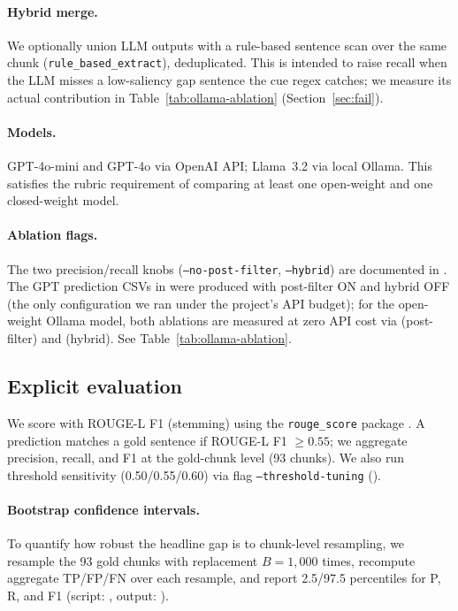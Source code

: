 \documentclass{article}
\begin{document}
\paragraph{Hybrid merge.} We optionally union LLM outputs with a rule-based sentence scan over the same chunk (\texttt{rule\_based\_extract}), deduplicated. This is intended to raise recall when the LLM misses a low-saliency gap sentence the cue regex catches; we measure its actual contribution in Table~\ref{tab:ollama-ablation} (Section~\ref{sec:fail}).

\paragraph{Models.} GPT-4o-mini and GPT-4o via OpenAI API; Llama~3.2 via local Ollama. This satisfies the rubric requirement of comparing at least one open-weight and one closed-weight model.

\paragraph{Ablation flags.} The two precision/recall knobs (\texttt{--no-post-filter}, \texttt{--hybrid}) are documented in . The GPT prediction CSVs in  were produced with post-filter ON and hybrid OFF (the only configuration we ran under the project's API budget); for the open-weight Ollama model, both ablations are measured at zero API cost via  (post-filter) and  (hybrid). See Table~\ref{tab:ollama-ablation}.

\subsection{Explicit evaluation}
We score with ROUGE-L F1 (stemming) using the \texttt{rouge\_score} package \citep{lin2004rouge,rougescore}. A prediction matches a gold sentence if ROUGE-L F1 $\ge 0.55$; we aggregate precision, recall, and F1 at the gold-chunk level (93 chunks). We also run threshold sensitivity (0.50/0.55/0.60) via  flag \texttt{--threshold-tuning} ().

\paragraph{Bootstrap confidence intervals.} To quantify how robust the headline gap is to chunk-level resampling, we resample the 93 gold chunks with replacement $B=1{,}000$ times, recompute aggregate TP/FP/FN over each resample, and report 2.5/97.5 percentiles for P, R, and F1 (script: , output: ).
\end{document}
